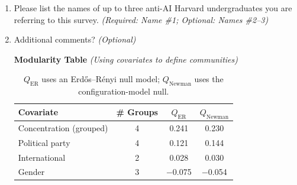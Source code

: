 \documentclass[11pt,a4paper,twocolumn,twoside]{rho-class/rho}
\begin{document}
\begin{enumerate}
    \bigskip

    \item Please list the names of up to three anti-AI Harvard undergraduates you are referring to this survey. \hfill \textit{(Required: Name \#1; Optional: Names \#2--3)}

    \bigskip

    \item Additional comments? \hfill \textit{(Optional)}

\bigskip
\noindent\textbf{Modularity Table} \textit{(Using covariates to define communities)}

\begin{table}[h]
\centering
\caption{$Q_{\text{ER}}$ uses an Erd\H{o}s--R\'enyi null model; $Q_{\text{Newman}}$ uses the configuration-model null.}
\label{tab:modularity-by-covariate}
\begin{tabular}{lccc}
\toprule
Covariate & \# Groups & $Q_{\text{ER}}$ & $Q_{\text{Newman}}$ \\
\midrule
Concentration (grouped)   & 4 & \phantom{-}0.241 & \phantom{-}0.230 \\
Political party           & 4 & \phantom{-}0.121 & \phantom{-}0.144 \\
International             & 2 & \phantom{-}0.028 & \phantom{-}0.030 \\
Gender                    & 3 & $-$0.075         & $-$0.054         \\
\bottomrule
\end{tabular}
\end{table}
\end{enumerate}

\end{document}
